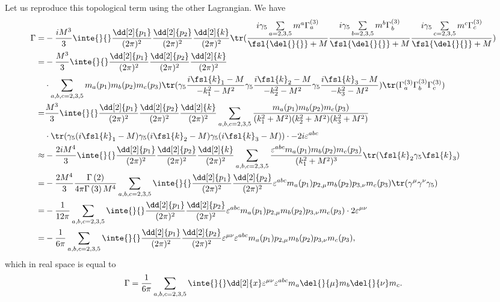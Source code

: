 Let us reproduce this topological term using the other Lagrangian. We have
\begin{align*}
	\Gamma =& -\frac{iM^{3}}{3}\inte{}{}\frac{\dd[2]{p_{1}}}{(2\pi)^{2}}\frac{\dd[2]{p_{2}}}{(2\pi)^{2}}\frac{\dd[2]{k}}{(2\pi)^{2}}\tr(\frac{i\gamma_{5}\sum\limits_{a = 2, 3, 5}m^{a}\Gamma_{a}^{(3)}}{\fsl{\del{}{}} + M}\frac{i\gamma_{5}\sum\limits_{b = 2, 3, 5}m^{b}\Gamma_{b}^{(3)}}{\fsl{\del{}{}} + M}\frac{i\gamma_{5}\sum\limits_{c = 2, 3, 5}m^{c}\Gamma_{c}^{(3)}}{\fsl{\del{}{}} + M}) \\
	       =& -\frac{M^{3}}{3}\inte{}{}\frac{\dd[2]{p_{1}}}{(2\pi)^{2}}\frac{\dd[2]{p_{2}}}{(2\pi)^{2}}\frac{\dd[2]{k}}{(2\pi)^{2}} \\
	        &\cdot\sum\limits_{a, b, c = 2, 3, 5}m_{a}(p_{1})m_{b}(p_{2})m_{c}(p_{3})\tr(\gamma_{5}\frac{i\fsl{k}_{1} - M}{-k_{1}^{2} - M^{2}}\gamma_{5}\frac{i\fsl{k}_{2} - M}{-k_{2}^{2} - M^{2}}\gamma_{5}\frac{i\fsl{k}_{3} - M}{-k_{3}^{2} - M^{2}})\tr(\Gamma_{a}^{(3)}\Gamma_{b}^{(3)}\Gamma_{c}^{(3)}) \\
	       =& \frac{M^{3}}{3}\inte{}{}\frac{\dd[2]{p_{1}}}{(2\pi)^{2}}\frac{\dd[2]{p_{2}}}{(2\pi)^{2}}\frac{\dd[2]{k}}{(2\pi)^{2}}\sum\limits_{a, b, c = 2, 3, 5}
	       \frac{m_{a}(p_{1})m_{b}(p_{2})m_{c}(p_{3})}{(k_{1}^{2} + M^{2})(k_{2}^{2} + M^{2})(k_{3}^{2} + M^{2})} \\
	        &\cdot\tr(\gamma_{5}(i\fsl{k}_{1} - M)\gamma_{5}(i\fsl{k}_{2} - M)\gamma_{5}(i\fsl{k}_{3} - M))\cdot -2i\varepsilon^{abc} \\
	 \approx& -\frac{2iM^{4}}{3}\inte{}{}\frac{\dd[2]{p_{1}}}{(2\pi)^{2}}\frac{\dd[2]{p_{2}}}{(2\pi)^{2}}\frac{\dd[2]{k}}{(2\pi)^{2}}\sum\limits_{a, b, c = 2, 3, 5}\frac{\varepsilon^{abc}m_{a}(p_{1})m_{b}(p_{2})m_{c}(p_{3})}{(k_{1}^{2} + M^{2})^{3}}\tr(\fsl{k}_{2}\gamma_{5}\fsl{k}_{3}) \\
	       =& -\frac{2M^{4}}{3}\frac{\Gamma\left(2\right)}{4\pi\Gamma\left(3\right)M^{4}}\sum\limits_{a, b, c = 2, 3, 5}\inte{}{}\frac{\dd[2]{p_{1}}}{(2\pi)^{2}}\frac{\dd[2]{p_{2}}}{(2\pi)^{2}}\varepsilon^{abc}m_{a}(p_{1})p_{2, \mu}m_{b}(p_{2})p_{3, \nu}m_{c}(p_{3})\tr(\gamma^{\mu}\gamma^{\nu}\gamma_{5}) \\
	       =& -\frac{1}{12\pi}\sum\limits_{a, b, c = 2, 3, 5}\inte{}{}\frac{\dd[2]{p_{1}}}{(2\pi)^{2}}\frac{\dd[2]{p_{2}}}{(2\pi)^{2}}\varepsilon^{abc}m_{a}(p_{1})p_{2, \mu}m_{b}(p_{2})p_{3, \nu}m_{c}(p_{3})\cdot 2\varepsilon^{\mu\nu} \\
	       =& -\frac{1}{6\pi}\sum\limits_{a, b, c = 2, 3, 5}\inte{}{}\frac{\dd[2]{p_{1}}}{(2\pi)^{2}}\frac{\dd[2]{p_{2}}}{(2\pi)^{2}}\varepsilon^{\mu\nu}\varepsilon^{abc}m_{a}(p_{1})p_{2, \mu}m_{b}(p_{2})p_{3, \nu}m_{c}(p_{3}),
\end{align*}
which in real space is equal to
\begin{align*}
	\Gamma = \frac{1}{6\pi}\sum\limits_{a, b, c = 2, 3, 5}\inte{}{}\dd[2]{x}\varepsilon^{\mu\nu}\varepsilon^{abc}m_{a}\del{}{\mu}m_{b}\del{}{\nu}m_{c}.
\end{align*}

